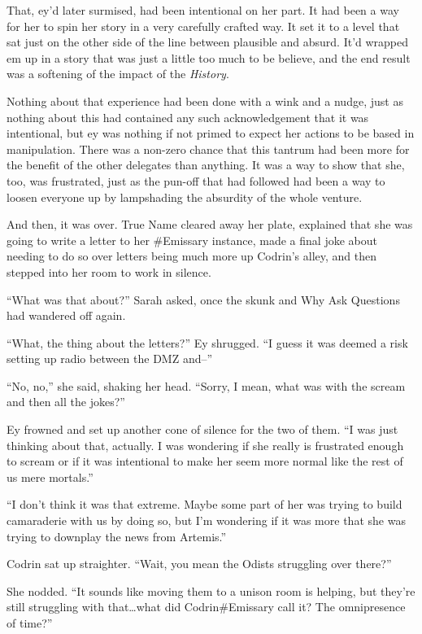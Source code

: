 That, ey'd later surmised, had been intentional on her part. It had been a way for her to spin her story in a very carefully crafted way. It set it to a level that sat just on the other side of the line between plausible and absurd. It'd wrapped em up in a story that was just a little too much to be believe, and the end result was a softening of the impact of the \emph{History}.

Nothing about that experience had been done with a wink and a nudge, just as nothing about this had contained any such acknowledgement that it was intentional, but ey was nothing if not primed to expect her actions to be based in manipulation. There was a non-zero chance that this tantrum had been more for the benefit of the other delegates than anything. It was a way to show that she, too, was frustrated, just as the pun-off that had followed had been a way to loosen everyone up by lampshading the absurdity of the whole venture.

And then, it was over. True Name cleared away her plate, explained that she was going to write a letter to her \#Emissary instance, made a final joke about needing to do so over letters being much more up Codrin's alley, and then stepped into her room to work in silence.

``What was that about?'' Sarah asked, once the skunk and Why Ask Questions had wandered off again.

``What, the thing about the letters?'' Ey shrugged. ``I guess it was deemed a risk setting up radio between the DMZ and--''

``No, no,'' she said, shaking her head. ``Sorry, I mean, what was with the scream and then all the jokes?''

Ey frowned and set up another cone of silence for the two of them. ``I was just thinking about that, actually. I was wondering if she really is frustrated enough to scream or if it was intentional to make her seem more normal like the rest of us mere mortals.''

``I don't think it was that extreme. Maybe some part of her was trying to build camaraderie with us by doing so, but I'm wondering if it was more that she was trying to downplay the news from Artemis.''

Codrin sat up straighter. ``Wait, you mean the Odists struggling over there?''

She nodded. ``It sounds like moving them to a unison room is helping, but they're still struggling with that\ldots what did Codrin\#Emissary call it? The omnipresence of time?''

